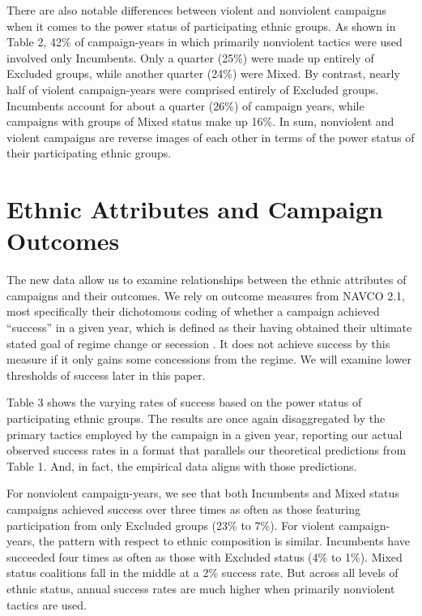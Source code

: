 \documentclass[
  letterpaper,
  DIV=11,
  numbers=noendperiod]{scrartcl}
\begin{document}
There are also notable differences between violent and nonviolent
campaigns when it comes to the power status of participating ethnic
groups. As shown in Table 2, 42\% of campaign-years in which primarily
nonviolent tactics were used involved only Incumbents. Only a quarter
(25\%) were made up entirely of Excluded groups, while another quarter
(24\%) were Mixed. By contrast, nearly half of violent campaign-years
were comprised entirely of Excluded groups. Incumbents account for about
a quarter (26\%) of campaign years, while campaigns with groups of Mixed
status make up 16\%. In sum, nonviolent and violent campaigns are
reverse images of each other in terms of the power status of their
participating ethnic groups.

\section{Ethnic Attributes and Campaign
Outcomes}\label{ethnic-attributes-and-campaign-outcomes}

The new data allow us to examine relationships between the ethnic
attributes of campaigns and their outcomes. We rely on outcome measures
from NAVCO 2.1, most specifically their dichotomous coding of whether a
campaign achieved ``success'' in a given year, which is defined as their
having obtained their ultimate stated goal of regime change or secession
\autocite{Chenoweth2022}. It does not achieve success by this measure if
it only gains some concessions from the regime. We will examine lower
thresholds of success later in this paper.

Table 3 shows the varying rates of success based on the power status of
participating ethnic groups. The results are once again disaggregated by
the primary tactics employed by the campaign in a given year, reporting
our actual observed success rates in a format that parallels our
theoretical predictions from Table 1. And, in fact, the empirical data
aligns with those predictions.

For nonviolent campaign-years, we see that both Incumbents and Mixed
status campaigns achieved success over three times as often as those
featuring participation from only Excluded groups (23\% to 7\%). For
violent campaign-years, the pattern with respect to ethnic composition
is similar. Incumbents have succeeded four times as often as those with
Excluded status (4\% to 1\%). Mixed status coalitions fall in the middle
at a 2\% success rate. But across all levels of ethnic status, annual
success rates are much higher when primarily nonviolent tactics are
used.
\end{document}
